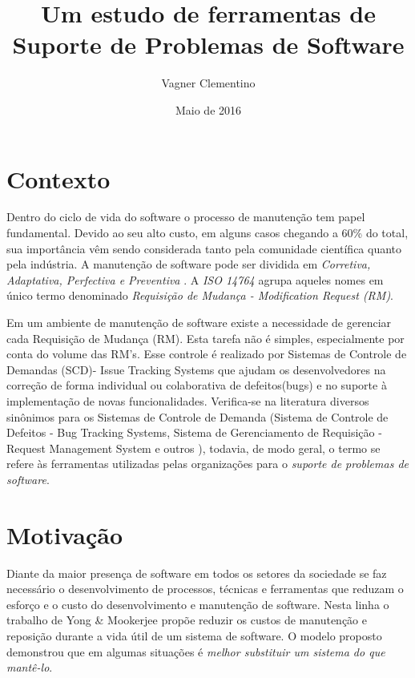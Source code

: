 \documentclass[12pt]{article}
\title{Um estudo de ferramentas de \\
	Suporte de Problemas de Software}
\author{Vagner Clementino\inst{1}}
\date{Maio de 2016}
\begin{document}
\maketitle

\section{Contexto}
Dentro do ciclo de vida do software o processo de manutenção tem papel fundamental. Devido ao seu alto custo, em alguns casos chegando a 60\% do total\cite{kaur2015review}, sua importância vêm sendo considerada tanto pela comunidade científica quanto pela indústria. A manutenção de software pode ser dividida em \textit{Corretiva, Adaptativa, Perfectiva e Preventiva} \cite{Lientz:1980:SMM:601062,159342}. A \textit{ISO 14764} \cite{1703974} agrupa aqueles nomes em único termo denominado \textit{Requisição de Mudança - Modification Request (RM)}.

Em um ambiente de manutenção de software existe a necessidade de gerenciar cada Requisição de Mudança (RM). Esta tarefa não é simples, especialmente por conta do volume das RM's. Esse controle é realizado por Sistemas de Controle de Demandas (SCD)- Issue Tracking Systems  que ajudam os desenvolvedores na correção de forma individual ou colaborativa de defeitos(bugs) e no suporte à implementação de novas funcionalidades. Verifica-se na literatura diversos sinônimos para os Sistemas de Controle de Demanda (Sistema de Controle de Defeitos - Bug Tracking Systems, Sistema de Gerenciamento de Requisição - Request Management System e outros ), todavia, de modo geral, o termo se refere às ferramentas utilizadas pelas organizações para o \textit{suporte de problemas de software}.

\section{Motivação}
Diante da maior presença de software em todos os setores da sociedade se faz necessário o desenvolvimento de processos, técnicas e ferramentas que reduzam o esforço e o custo do desenvolvimento e manutenção de software. Nesta linha o trabalho de Yong \& Mookerjee \cite{1423995}   propõe reduzir os custos de manutenção e reposição durante a vida útil de um sistema de software. O modelo
proposto demonstrou que em algumas situações é \textit{melhor substituir um sistema do que mantê-lo}.
\end{document}

